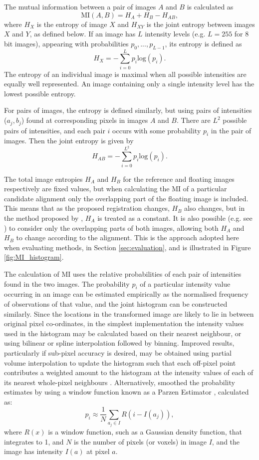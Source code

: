 \documentclass{report}
\begin{document}
The mutual information between a pair of images $A$ and $B$ is calculated as
\begin{equation}
\text{MI}(A,B) = H_A + H_B - H_{AB},
\label{eq:MI}
\end{equation}
where $H_X$ is the entropy of image $X$ and $H_{XY}$ is the joint entropy between images $X$ and $Y$, as defined below. If an image has $L$ intensity levels (e.g. $L=255$ for 8 bit images), appearing with probabilities $p_0, ..., p_{L-1}$, its entropy is defined as
\[
H_X = - \sum_{i = 0}^L p_i \text{log}({p_i}).
\]
The entropy of an individual image is maximal when all possible intensities are equally well represented. An image containing only a single intensity level has the lowest possible entropy.

For pairs of images, the entropy is defined similarly, but using pairs of intensities ($a_j, b_j$) found at corresponding pixels in images $A$ and $B$. There are $L^2$ possible pairs of intensities, and each pair $i$ occurs with some probability $p_i$ in the pair of images. Then the joint entropy is given by
\[
H_{AB} = - \sum_{i = 0}^{L^2} p_i \text{log}({p_i}).
\]

The total image entropies $H_A$ and $H_B$ for the reference and floating images respectively are fixed values, but when calculating the MI of a particular candidate alignment only the overlapping part of the floating image is included. This means that as the proposed registration changes, $H_B$ also changes, but in the method proposed by \cite{wells1996multi}, $H_A$ is treated as a constant. It is also possible (e.g. see \cite{maes1997multimodality}) to consider only the overlapping parts of both images, allowing both $H_A$ and $H_B$ to change according to the alignment. This is the approach adopted here when evaluating methods, in Section \ref{sec:evaluation}, and is illustrated in Figure \ref{fig:MI_histogram}.

The calculation of MI uses the relative probabilities of each pair of intensities found in the two images. The probability $p_i$ of a particular intensity value occurring in an image can be estimated empirically as the normalised frequency of observations of that value, and the joint histogram can be constructed similarly. Since the locations in the transformed image are likely to lie in between original pixel co-ordinates, in the simplest implementation the intensity values used in the histogram may be calculated based on their nearest neighbour, or using bilinear or spline interpolation followed by binning. Improved results, particularly if sub-pixel accuracy is desired, may be obtained using partial volume interpolation to update the histogram such that each off-pixel point contributes a weighted amount to the histogram at the intensity values of each of its nearest whole-pixel neighbours \citep{maes1997multimodality}. Alternatively, \cite{viola1997alignment} smoothed the probability estimates by using a window function known as a Parzen Estimator \citep{parzen1962estimation}, calculated as:
\[
p_i \approx \frac{1}{N} \sum_{a_j \in I} R(i - I(a_j)),
\]
where $R(x)$ is a window function, such as a Gaussian density function, that integrates to 1, and $N$ is the number of pixels (or voxels) in image $I$, and the image has intensity $I(a)$ at pixel $a$.
\end{document}
